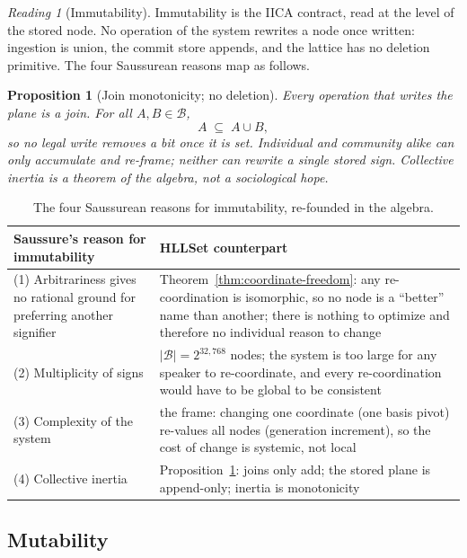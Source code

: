 \documentclass[11pt,a4paper]{article}
\newtheorem{proposition}[principle]{Proposition}
\theoremstyle{remark}
\newtheorem{reading}[principle]{Reading}
\newcommand{\Lat}{\ensuremath{\mathcal{B}}}              %
\begin{document}
\begin{reading}[Immutability]
\label{read:immutability}
Immutability is the IICA contract, read at the level of the stored node. No
operation of the system rewrites a node once written: ingestion is union, the
commit store appends, and the lattice has no deletion primitive. The four
Saussurean reasons map as follows.
\end{reading}

\begin{proposition}[Join monotonicity; no deletion]
\label{prop:inertia}
Every operation that writes the plane is a join. For all $A, B \in \Lat$,
\[
  A \;\subseteq\; A \cup B,
\]
so no legal write removes a bit once it is set. Individual and community alike
can only \emph{accumulate} and \emph{re-frame}; neither can rewrite a single
stored sign. Collective inertia is a theorem of the algebra, not a sociological
hope.
\end{proposition}

\begin{table}[htbp]
\centering
\begin{tabular}{@{}>{\raggedright\arraybackslash}p{4.6cm}
                    >{\raggedright\arraybackslash}p{10.6cm}@{}}
\toprule
Saussure's reason for immutability & HLLSet counterpart \\
\midrule
(1) Arbitrariness gives no rational ground for preferring another signifier &
Theorem~\ref{thm:coordinate-freedom}: any re-coordination is isomorphic,
so no node is a ``better'' name than another; there is nothing to optimize and
therefore no individual reason to change \\
(2) Multiplicity of signs &
$|\Lat| = 2^{32{,}768}$ nodes; the system is too large for any speaker to
re-coordinate, and every re-coordination would have to be global to be
consistent \\
(3) Complexity of the system &
the frame: changing one coordinate (one basis pivot) re-values all nodes
(generation increment), so the cost of change is systemic, not local \\
(4) Collective inertia &
Proposition~\ref{prop:inertia}: joins only add; the stored plane is
append-only; inertia is monotonicity \\
\bottomrule
\end{tabular}
\caption{The four Saussurean reasons for immutability, re-founded in the algebra.}
\label{tab:immutability}
\end{table}

\subsection{Mutability}
\label{sec:mutability}
\end{document}

